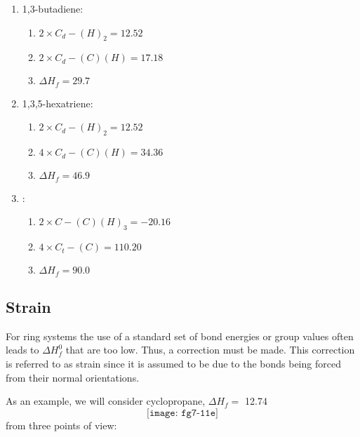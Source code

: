 \begin{enumerate}
\item 1,3-butadiene:
  \begin{enumerate}
  \item $2\times C_d-(H)_2 = 12.52$
  \item $2\times C_d-(C)(H) = 17.18$
  \item $\Delta H_f = 29.7$
  \end{enumerate}
\item 1,3,5-hexatriene:
  \begin{enumerate}
  \item $2\times C_d-(H)_2 = 12.52$
  \item $4\times C_d-(C)(H) = 34.36$
  \item $\Delta H_f = 46.9$
  \end{enumerate}
\item {}:
  \begin{enumerate}
  \item $2\times C - (C)(H)_3 = - 20.16$
  \item $4\times C_t - (C) = 110.20$
  \item $\Delta H_f = 90.0$
  \end{enumerate}
\end{enumerate}

\subsection{Strain}

For ring systems the use of a standard set of bond energies or group 
values often leads to $\Delta H_f^0$ that are too low. Thus, a correction must 
be made. This correction is referred to as strain since it is assumed 
to be due to the bonds being forced from their normal orientations.

As an example, we will consider cyclopropane, $\Delta H_f =$ 12.74
\begin{equation}
\texttt{[image: fg7-11e]}
\end{equation}
from three points of view: 

